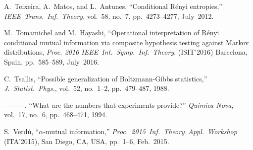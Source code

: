 \documentclass[conference, draftcls, onecolumn]{IEEEtran}
\theoremstyle{plain}
\begin{document}
\begin{thebibliography}{99}
A.~Teixeira, A.~Matos, and L.~Antunes,
``Conditional R\'{e}nyi entropies,''
\emph{IEEE\ Trans.\ Inf.\ Theory},
vol.~58, no.~7, pp.~4273--4277, July~2012.

M.~Tomamichel and M.~Hayashi,
``Operational interpretation of R\'{e}nyi conditional mutual information via composite hypothesis testing against Markov distributions,
\emph{Proc. 2016 IEEE\ Int.\ Symp.\ Inf.\ Theory}, (ISIT'2016)
Barcelona, Spain, pp.~585--589, July~2016.

C.~Tsallis,
``Possible generalization of Boltzmann-Gibbs statistics,''
\emph{J.~Statist.~Phys.},
vol.~52, no.~1--2, pp.~479--487, 1988.

---------,
``What are the numbers that experiments provide?''
\emph{Qu\'{i}mica Nova},
vol.~17, no.~6, pp.~468--471, 1994.

S.~Verd\'{u},
``$\alpha$-mutual information,''
\emph{Proc.\ 2015\ Inf.\ Theory\ Appl.\ Workshop} (ITA'2015),
San Diego, CA, USA, pp.~1--6, Feb.~2015.

\end{thebibliography}
\end{document}
